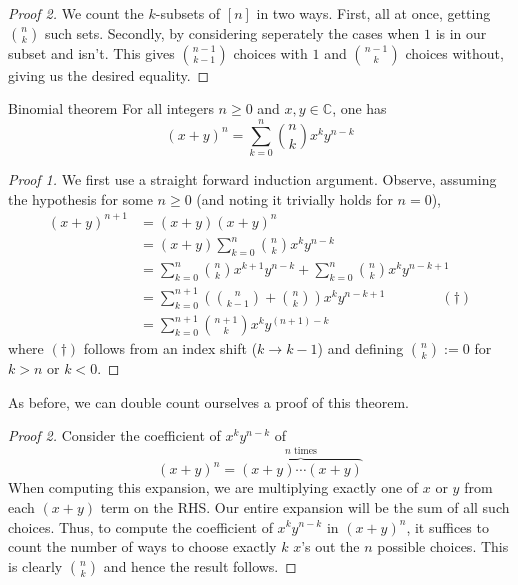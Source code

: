 \documentclass{article}
\begin{document}
\begin{proof}[Proof 2]
    We count the $k$-subsets of $[n]$ in two ways. First, all at once, getting $\binom{n}{k}$ such sets. Secondly, by considering seperately the 
    cases when $1$ is in our subset and isn't. This gives $\binom{n-1}{k-1}$ choices with $1$ and $\binom{n-1}{k}$ choices without, giving us the 
    desired equality. 
\end{proof}


\begin{theorem}[]{Binomial theorem}
    For all integers $n \geq 0$ and $x, y \in \mathbb{C}$, one has
    \[(x + y)^n = \sum_{k=0}^n \binom{n}{k}x^ky^{n-k}\]
\end{theorem}

\begin{proof}[Proof 1]
    We first use a straight forward induction argument. Observe, assuming the hypothesis for some $n \geq 0$ (and noting it trivially holds for $n=0$),
    \begin{align*}
        (x+y)^{n+1} &= (x+y)(x+y)^n \\
        &= (x+y)\sum_{k=0}^n \binom{n}{k}x^k y^{n-k} \\
        &= \sum_{k=0}^n \binom{n}{k}x^{k+1}y^{n-k} + \sum_{k=0}^n \binom{n}{k}x^k y^{n-k+1} \\
        &= \sum_{k=0}^{n+1} \left(\binom{n}{k-1} + \binom{n}{k}\right)x^ky^{n - k + 1} \qquad \qquad (\dagger)\\
        &= \sum_{k=0}^{n+1}\binom{n+1}{k}x^ky^{(n+1)-k}
    \end{align*}
    where $(\dagger)$ follows from an index shift ($k \to k-1$) and defining $\binom{n}{k} := 0$ for $k > n$ or $k < 0$.
\end{proof}

As before, we can double count ourselves a proof of this theorem. 

\begin{proof}[Proof 2]
    Consider the coefficient of $x^ky^{n-k}$ of \[(x+y)^n = \overbrace{(x+y)\cdots(x+y)}^{n \text{ times}}\] When computing this expansion, 
    we are multiplying exactly one of $x$ or $y$ from each $(x+y)$ term on the RHS. Our entire expansion will be the sum of all such choices. 
    Thus, to compute the coefficient of $x^ky^{n-k}$ in $(x+y)^n$, it suffices to count the number of ways to choose exactly $k$ $x$'s out the 
    $n$ possible choices. This is clearly $\binom{n}{k}$ and hence the result follows. 
\end{proof}
\end{document}
